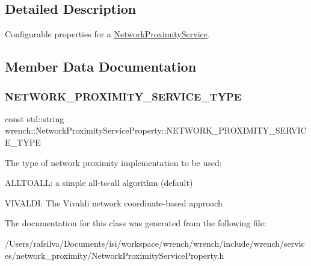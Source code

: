 \subsection{Detailed Description}
Configurable properties for a \hyperlink{classwrench_1_1_network_proximity_service}{Network\+Proximity\+Service}. 

\subsection{Member Data Documentation}
\mbox{\label{classwrench_1_1_network_proximity_service_property_a4cb766dcd609012ab68000cfd9dc11b1}} 
\subsubsection{\texorpdfstring{N\+E\+T\+W\+O\+R\+K\+\_\+\+P\+R\+O\+X\+I\+M\+I\+T\+Y\+\_\+\+S\+E\+R\+V\+I\+C\+E\+\_\+\+T\+Y\+PE}{NETWORK\_PROXIMITY\_SERVICE\_TYPE}}
{\footnotesize\ttfamily const std\+::string wrench\+::\+Network\+Proximity\+Service\+Property\+::\+N\+E\+T\+W\+O\+R\+K\+\_\+\+P\+R\+O\+X\+I\+M\+I\+T\+Y\+\_\+\+S\+E\+R\+V\+I\+C\+E\+\_\+\+T\+Y\+PE\hspace{0.3cm}{\ttfamily [static]}}



The type of network proximity implementation to be used\+: 


\begin{DoxyItemize}
\item A\+L\+L\+T\+O\+A\+LL\+: a simple all-\/to-\/all algorithm (default)
\item V\+I\+V\+A\+L\+DI\+: The Vivaldi network coordinate-\/based approach 
\end{DoxyItemize}

The documentation for this class was generated from the following file\+:\begin{DoxyCompactItemize}
\item 
/\+Users/rafsilva/\+Documents/isi/workspace/wrench/wrench/include/wrench/services/network\+\_\+proximity/Network\+Proximity\+Service\+Property.\+h\end{DoxyCompactItemize}
